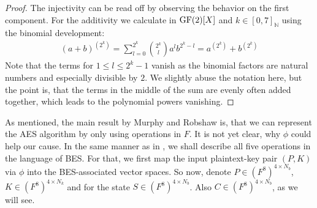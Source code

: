 \begin{proof}
    The injectivity can be read off by observing the behavior on the first component. For the additivity we calculate in \(\operatorname{GF}(2)[X]\) and \(k \in [0, 7]_{\mathbb{N}}\) using the binomial development:
    \begin{align}
        (a+b)^{\left(2^k\right)} = \sum_{l=0}^{2^k} \binom{2^k}{l} a^l b^{2^k-l} = a^{\left(2^k\right)} + b^{\left(2^k\right)}
    \end{align}
    Note that the terms for \(1 \leq l \leq 2^k-1\) vanish as the binomial factors are natural numbers and especially divisible by \(2\). We slightly abuse the notation here, but the point is, that the terms in the middle of the sum are evenly often added together, which leads to the polynomial powers vanishing.
\end{proof}

\phantom{}

As mentioned, the main result by Murphy and Robshaw is, that we can represent the AES algorithm by only using operations in \(F\). It is not yet clear, why \(\phi\) could help our cause. In the same manner as in , we shall describe all five operations in the language of BES. For that, we first map the input plaintext-key pair \((P, K)\) via \(\phi\) into the BES-associated vector spaces. So now, denote \(P \in \left(F^8\right)^{4 \times N_b}\), \(K \in \left(F^8\right)^{4 \times N_k}\) and for the state \(S \in \left(F^8\right)^{4 \times N_b}\). Also \(C \in \left(F^8\right)^{4 \times N_b}\), as we will see.

